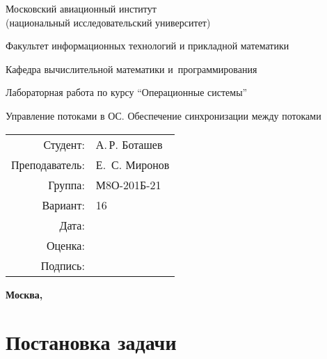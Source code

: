 \documentclass[pdf, unicode, 12pt, a4paper,oneside,fleqn]{article}
\begin{document}
\begin{titlepage}
    \begin{center}
        \bfseries

        {\Large Московский авиационный институт\\ (национальный исследовательский университет)}
        
        \vspace{48pt}
        
        {\large Факультет информационных технологий и прикладной математики}
        
        \vspace{36pt}
        
        {\large Кафедра вычислительной математики и~программирования}
        
        \vspace{48pt}
        
        Лабораторная работа  по курсу \enquote{Операционные системы}

        \vspace{48pt}

        Управление потоками в ОС. Обеспечение синхронизации между потоками
    \end{center}
    
    \vspace{140pt}
    
    \begin{flushright}
    \begin{tabular}{rl}
    Студент: & А.\,Р. Боташев \\
    Преподаватель: & Е. \,С. Миронов \\
    Группа: & М8О-201Б-21 \\
    Вариант: & 16 \\
    Дата: & \\
    Оценка: & \\
    Подпись: & \\
    \end{tabular}
    \end{flushright}
    
    \vfill
    
    \begin{center}
    \bfseries
    Москва, \the\year
    \end{center}
\end{titlepage}
    
\pagebreak

\section{Постановка задачи}
\end{document}
